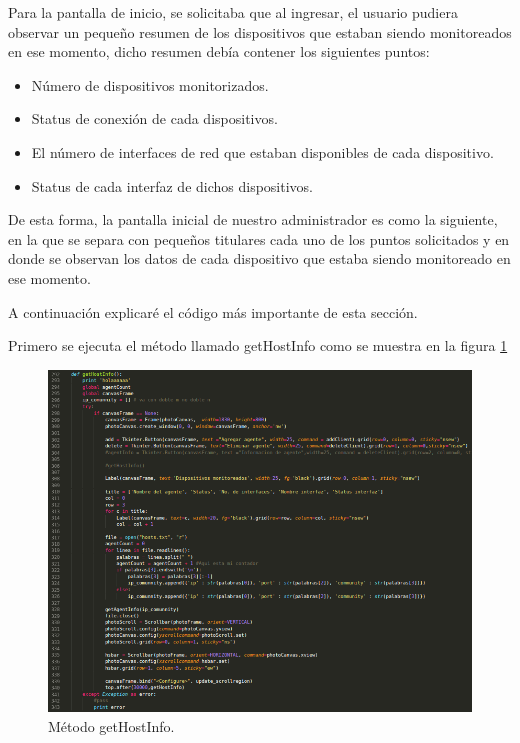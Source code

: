Para la pantalla de inicio, se solicitaba que al ingresar, el usuario pudiera observar un pequeño resumen de los dispositivos que estaban siendo monitoreados en ese momento, dicho resumen debía contener los siguientes puntos:
\begin{itemize}
\item Número de dispositivos monitorizados.
\item Status de conexión de cada dispositivos.
\item El número de interfaces de red que estaban disponibles de cada dispositivo.
\item Status de cada interfaz de dichos dispositivos.
\end{itemize}

De esta forma, la pantalla inicial de nuestro administrador es como la siguiente, en la que se separa con pequeños titulares cada uno de los puntos solicitados y en donde se observan los datos de cada dispositivo que estaba siendo monitoreado en ese momento.

A continuación explicaré el código más importante de esta sección.
\\ \par
Primero se ejecuta el método llamado getHostInfo como se muestra en la figura  \ref{image:principal0}
\FloatBarrier
\begin{figure}[htbp!]
		\centering
	\includegraphics[width=.75 \textwidth]{images/principal0}
		\caption{Método getHostInfo.}		\label{image:principal0}
\end{figure}
\FloatBarrier

